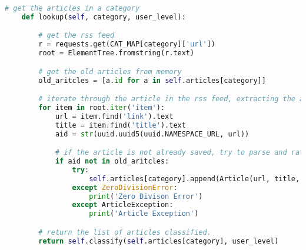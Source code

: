 \begin{lstlisting}[caption={[Article Discovery Code] Python code for obtaining news articles from the \textit{Google News} RSS feeds.}, label=lst:disc, language=python, float]
    # get the articles in a category
    def lookup(self, category, user_level):

        # get the rss feed
        r = requests.get(CAT_MAP[category]['url'])
        root = ElementTree.fromstring(r.text)

        # get the old articles from memory
        old_aritcles = [a.id for a in self.articles[category]]

        # iterate through the article in the rss feed, extracting the articles
        for item in root.iter('item'):
            url = item.find('link').text
            title = item.find('title').text
            aid = str(uuid.uuid5(uuid.NAMESPACE_URL, url))

            # if the article is not already saved, try to parse and rate it (some articles fail)
            if aid not in old_aritcles:
                try:
                    self.articles[category].append(Article(url, title, aid, category))
                except ZeroDivisionError:
                    print('Zero Divison Error')
                except ArticleException:
                    print('Article Exception')

        # return the list of articles classified.
        return self.classify(self.articles[category], user_level)
\end{lstlisting}
